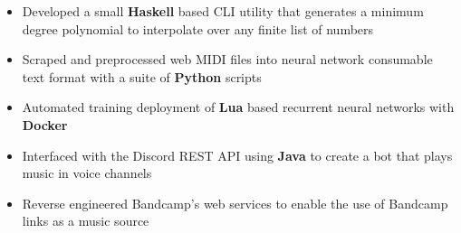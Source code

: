 \documentclass[10pt,letterpaper]{altacv}
\begin{document}


\bigskip


\begin{itemize}
    \item Developed a small \textbf{Haskell} based CLI utility that generates a 
        minimum degree polynomial to interpolate over any finite list of numbers
\end{itemize}

\divider

\begin{itemize}
    \item Scraped and preprocessed web MIDI files into neural network 
        consumable text format with a suite of \textbf{Python} scripts
    \item Automated training deployment of \textbf{Lua} based recurrent neural 
        networks with \textbf{Docker}
\end{itemize}

\divider

\begin{itemize}
    \item Interfaced with the Discord REST API using \textbf{Java} to create a 
        bot that plays music in voice channels
    \item Reverse engineered Bandcamp's web services to enable the use of 
        Bandcamp links as a music source
\end{itemize}



\medskip


\end{document}
